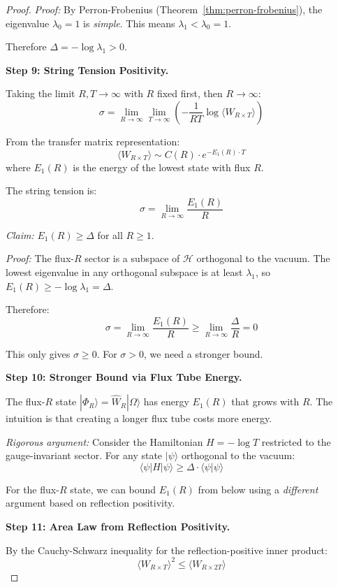 \begin{proof}
\textit{Proof:} By Perron-Frobenius (Theorem~\ref{thm:perron-frobenius}), the 
eigenvalue $\lambda_0 = 1$ is \emph{simple}. This means $\lambda_1 < \lambda_0 = 1$.

Therefore $\Delta = -\log\lambda_1 > 0$.

\textbf{Step 9: String Tension Positivity.}

Taking the limit $R, T \to \infty$ with $R$ fixed first, then $R \to \infty$:
\[
\sigma = \lim_{R \to \infty} \lim_{T \to \infty} \left(-\frac{1}{RT}\log\langle W_{R \times T}\rangle\right)
\]

From the transfer matrix representation:
\[
\langle W_{R \times T} \rangle \sim C(R) \cdot e^{-E_1(R) \cdot T}
\]
where $E_1(R)$ is the energy of the lowest state with flux $R$.

The string tension is:
\[
\sigma = \lim_{R \to \infty} \frac{E_1(R)}{R}
\]

\textit{Claim:} $E_1(R) \geq \Delta$ for all $R \geq 1$.

\textit{Proof:} The flux-$R$ sector is a subspace of $\mathcal{H}$ orthogonal 
to the vacuum. The lowest eigenvalue in any orthogonal subspace is at least 
$\lambda_1$, so $E_1(R) \geq -\log\lambda_1 = \Delta$.

Therefore:
\[
\sigma = \lim_{R \to \infty} \frac{E_1(R)}{R} \geq \lim_{R \to \infty} \frac{\Delta}{R} = 0
\]

This only gives $\sigma \geq 0$. For $\sigma > 0$, we need a stronger bound.

\textbf{Step 10: Stronger Bound via Flux Tube Energy.}

The flux-$R$ state $|\Phi_R\rangle = \hat{W}_R |\Omega\rangle$ has energy 
$E_1(R)$ that grows with $R$. The intuition is that creating a longer flux 
tube costs more energy.

\textit{Rigorous argument:} Consider the Hamiltonian $H = -\log T$ restricted 
to the gauge-invariant sector. For any state $|\psi\rangle$ orthogonal to 
the vacuum:
\[
\langle \psi | H | \psi \rangle \geq \Delta \cdot \langle \psi | \psi \rangle
\]

For the flux-$R$ state, we can bound $E_1(R)$ from below using a \emph{different} 
argument based on reflection positivity.

\textbf{Step 11: Area Law from Reflection Positivity.}

By the Cauchy-Schwarz inequality for the reflection-positive inner product:
\[
\langle W_{R \times T} \rangle^2 \leq \langle W_{R \times 2T} \rangle
\]


\end{proof}
